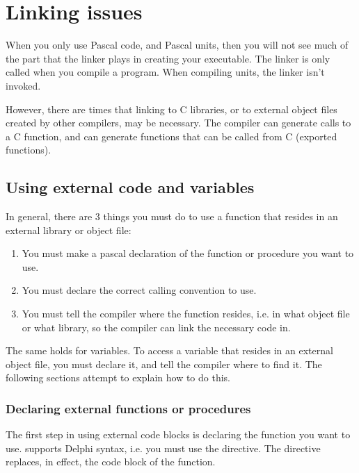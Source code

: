\chapter{Linking issues}
\label{ch:Linking}
When you only use Pascal code, and Pascal units, then you will not see much
of the part that the linker plays in creating your executable.
The linker is only called when you compile a program. When compiling units,
the linker isn't invoked.

However, there are times that linking to C libraries, or to external
object files created by other compilers, may be necessary. The \fpc compiler
can generate calls to a C function, and can generate functions that can
be called from C (exported functions).


\section{Using external code and variables}

In general, there are 3 things you must do to use a function that resides in
an external library or object file:
\begin{enumerate}
\item You must make a pascal declaration of the function or procedure you
want to use.
\item You must declare the correct calling convention to use.
\item You must tell the compiler where the function resides, i.e. in what
object file or what library, so the compiler can link the necessary code in.
\end{enumerate}
The same holds for variables. To access a variable that resides in an
external object file, you must declare it, and tell the compiler where to
find it.
The following sections attempt to explain how to do this.


\subsection{Declaring external functions or procedures}
\label{se:ExternalFunction}

The first step in using external code blocks is declaring the function you
want to use. \fpc supports Delphi syntax, i.e. you must use the
 directive. The  directive replaces, in effect,
the code block of the function.

